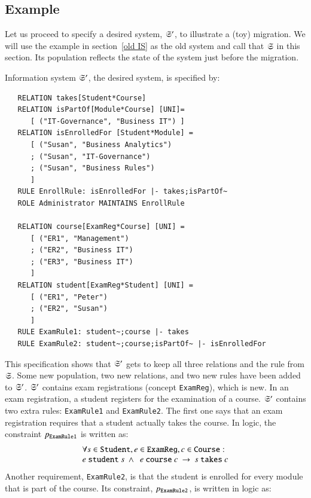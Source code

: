 \documentclass{elsarticle}
\begin{document}
\subsection{Example}
   Let us proceed to specify a desired system, $\mathfrak{S}'$, to illustrate a (toy) migration.
   We will use the example in section~\ref{old IS} as the old system
   and call that $\mathfrak{S}$ in this section.
   Its population reflects the state of the system just before the migration.

   Information system $\mathfrak{S}'$, the desired system, is specified by:
\begin{verbatim}
   RELATION takes[Student*Course]
   RELATION isPartOf[Module*Course] [UNI]=
      [ ("IT-Governance", "Business IT") ]
   RELATION isEnrolledFor [Student*Module] =
      [ ("Susan", "Business Analytics")
      ; ("Susan", "IT-Governance")
      ; ("Susan", "Business Rules")
      ]
   RULE EnrollRule: isEnrolledFor |- takes;isPartOf~
   ROLE Administrator MAINTAINS EnrollRule
   
   RELATION course[ExamReg*Course] [UNI] =
      [ ("ER1", "Management")
      ; ("ER2", "Business IT")
      ; ("ER3", "Business IT")
      ]
   RELATION student[ExamReg*Student] [UNI] =
      [ ("ER1", "Peter")
      ; ("ER2", "Susan")
      ]
   RULE ExamRule1: student~;course |- takes
   RULE ExamRule2: student~;course;isPartOf~ |- isEnrolledFor
\end{verbatim}
   This specification shows that $\mathfrak{S}'$ gets to keep all three relations and the rule from $\mathfrak{S}$.
   Some new population, two new relations, and two new rules have been added to $\mathfrak{S}'$.
   $\mathfrak{S}'$ contains exam registrations (concept \verb-ExamReg-), which is new.
   In an exam registration, a student registers for the examination of a course.
   $\mathfrak{S}'$ contains two extra rules: \verb-ExamRule1- and \verb-ExamRule2-.
   The first one says that an exam registration requires that a student actually takes the course.
   In logic, the constraint $p_{\tt ExamRule1}$ is written as:
\[\begin{array}{l}\forall s\in\text{\tt Student}, e\in\text{\tt ExamReg}, c\in\text{\tt Course}:\\
   e\ \text{\tt student}\ s\ \wedge\ \ e\ \text{\tt course}\ c\ \rightarrow\ s\ \text{\tt takes}\ c\\
\end{array}\]
   Another requirement, \verb-ExamRule2-, is that the student is enrolled for every module that is part of the course.
   Its constraint, $p_{\tt ExamRule2}$, is written in logic as:
\end{document}
